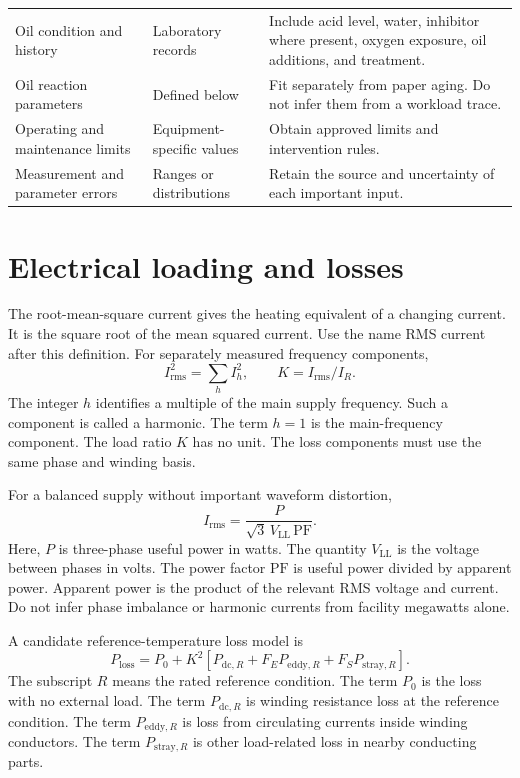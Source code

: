 \documentclass[11pt,a4paper]{report}
\begin{document}
\begin{longtable}{L{0.21\textwidth}L{0.21\textwidth}L{0.46\textwidth}}
Oil condition and history & Laboratory records & Include acid level, water, inhibitor where present, oxygen exposure, oil additions, and treatment. \\
Oil reaction parameters & Defined below & Fit separately from paper aging. Do not infer them from a workload trace. \\
Operating and maintenance limits & Equipment-specific values & Obtain approved limits and intervention rules. \\
Measurement and parameter errors & Ranges or distributions & Retain the source and uncertainty of each important input. \\
\bottomrule
\end{longtable}

\section{Electrical loading and losses}
The root-mean-square current gives the heating equivalent of a changing current.
It is the square root of the mean squared current.
Use the name RMS current after this definition.
For separately measured frequency components,
\begin{equation}
I_{\mathrm{rms}}^2=\sum_h I_h^2,\qquad K=I_{\mathrm{rms}}/I_R.
\end{equation}
The integer $h$ identifies a multiple of the main supply frequency.
Such a component is called a harmonic.
The term $h=1$ is the main-frequency component.
The load ratio $K$ has no unit.
The loss components must use the same phase and winding basis.

For a balanced supply without important waveform distortion,
\begin{equation}
I_{\mathrm{rms}}=\frac{P}{\sqrt{3}\,V_{\mathrm{LL}}\,\mathrm{PF}}.
\end{equation}
Here, $P$ is three-phase useful power in watts.
The quantity $V_{\mathrm{LL}}$ is the voltage between phases in volts.
The power factor $\mathrm{PF}$ is useful power divided by apparent power.
Apparent power is the product of the relevant RMS voltage and current.
Do not infer phase imbalance or harmonic currents from facility megawatts alone.

A candidate reference-temperature loss model is
\begin{equation}
P_{\mathrm{loss}}=P_0+K^2\left[
P_{\mathrm{dc},R}+F_E P_{\mathrm{eddy},R}+F_S P_{\mathrm{stray},R}
\right].
\label{eq:transformer-loss}
\end{equation}
The subscript $R$ means the rated reference condition.
The term $P_0$ is the loss with no external load.
The term $P_{\mathrm{dc},R}$ is winding resistance loss at the reference condition.
The term $P_{\mathrm{eddy},R}$ is loss from circulating currents inside winding conductors.
The term $P_{\mathrm{stray},R}$ is other load-related loss in nearby conducting parts.
\end{document}
